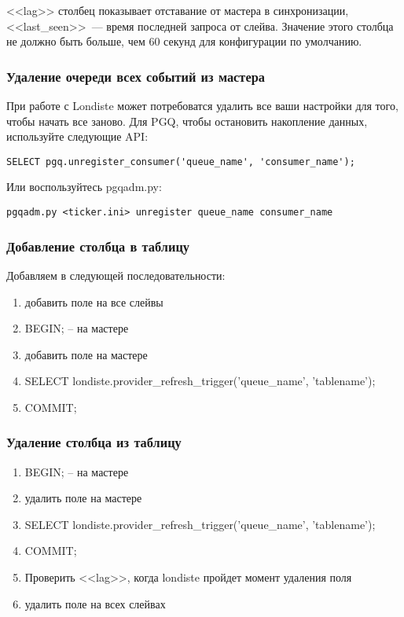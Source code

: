<<lag>> столбец показывает отставание от мастера в синхронизации, 
<<last\_seen>>~--- время последней запроса от слейва. Значение этого столбца не должно быть больше, 
чем 60 секунд для конфигурации по умолчанию.

\subsubsection{Удаление очереди всех событий из мастера}
При работе с Londiste может потребоватся удалить все ваши настройки для того, чтобы начать все заново. 
Для PGQ, чтобы остановить накопление данных, используйте следующие API:
\begin{verbatim}
SELECT pgq.unregister_consumer('queue_name', 'consumer_name');
\end{verbatim}

Или воспользуйтесь pgqadm.py:
\begin{verbatim}
pgqadm.py <ticker.ini> unregister queue_name consumer_name
\end{verbatim}

\subsubsection{Добавление столбца в таблицу}
Добавляем в следующей последовательности:
\begin{enumerate}
 \item добавить поле на все слейвы
 \item BEGIN; -- на мастере
 \item добавить поле на мастере
 \item SELECT londiste.provider\_refresh\_trigger('queue\_name', 'tablename');
 \item COMMIT;
\end{enumerate}

\subsubsection{Удаление столбца из таблицу}
\begin{enumerate}
 \item BEGIN; -- на мастере
 \item удалить поле на мастере
 \item SELECT londiste.provider\_refresh\_trigger('queue\_name', 'tablename');
 \item COMMIT;
 \item Проверить <<lag>>, когда londiste пройдет момент удаления поля
 \item удалить поле на всех слейвах
\end{enumerate}

